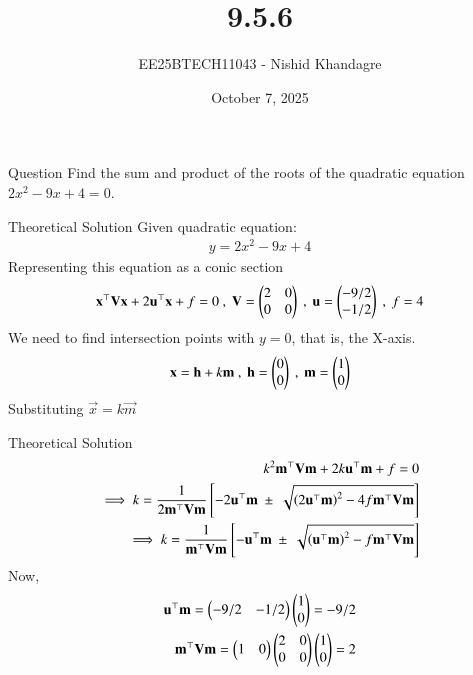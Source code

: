 \documentclass{beamer}
\title
{9.5.6}
\date{October 7, 2025}
\author
{EE25BTECH11043 - Nishid Khandagre}
\begin{document}
\frame{\titlepage}

\begin{frame}{Question}
Find the sum and product of the roots of the quadratic equation
$2x^2-9x + 4 = 0$.
\end{frame}

\begin{frame}{Theoretical Solution}
Given quadratic equation:
\begin{align}
    y=2x^2 - 9x + 4
\end{align}
Representing this equation as a conic section
\begin{align}
    \mathbf{x}^{\top}\mathbf{V}\mathbf{x} + 2\mathbf{u}^{\top}\mathbf{x} + f=0 \ , \  \mathbf{V}=\begin{pmatrix}2 & 0\\0&0\end{pmatrix} \ , \  \mathbf{u}=\begin{pmatrix}-9/2 \\ -1/2\end{pmatrix} \ ,\ f=4
\end{align}
We need to find intersection points with $y=0$, that is, the X-axis.
\begin{align}
    \vec{x}=\vec{h} + k \vec{m} \ , \ \vec{h}=\myvec{0 \\ 0} \ , \ \vec{m}=\myvec{1 \\ 0}
\end{align}
Substituting $\vec{x} = k \vec{m}$
\end{frame}

\begin{frame}{Theoretical Solution}
\begin{align}
    k^2\mathbf{m}^{\top}\mathbf{V}\mathbf{m} + 2k\mathbf{u}^{\top}\mathbf{m} + f=0 \\
    \implies k= \dfrac{1}{2 \mathbf{m}^{\top}\mathbf{V}\mathbf{m}} {}\left[ -2\mathbf{u}^{\top}\mathbf{m} \ \pm \ \sqrt{\left(2\mathbf{u}^{\top}\mathbf{m}\right)^2 - 4 f \mathbf{m}^{\top}\mathbf{V}\mathbf{m}}\right]\\
    \implies k= \dfrac{1}{\mathbf{m}^{\top}\mathbf{V}\mathbf{m}} {}\left[ -\mathbf{u}^{\top}\mathbf{m} \ \pm \ \sqrt{\left(\mathbf{u}^{\top}\mathbf{m}\right)^2-f \mathbf{m}^{\top}\mathbf{V}\mathbf{m}}\right]
\end{align}
Now,
\begin{align}
    \mathbf{u}^{\top}\mathbf{m} = \begin{pmatrix}-9/2 & -1/2\end{pmatrix}\begin{pmatrix}1 \\0\end{pmatrix} = -9/2 \\
    \mathbf{m}^{\top}\mathbf{V}\mathbf{m}=\begin{pmatrix}1 & 0\end{pmatrix}\begin{pmatrix}2 & 0\\0&0\end{pmatrix}\begin{pmatrix}1 \\ 0\end{pmatrix} = 2
\end{align}
\end{frame}
\end{document}
